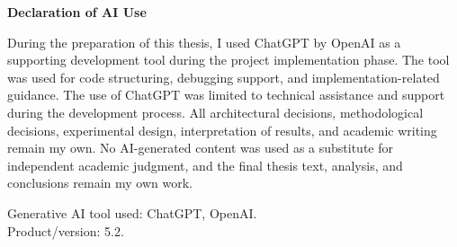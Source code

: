 \newpage
\vspace*{2.2 cm}
{\Large
\noindent
{\bf Declaration of AI Use}} \\
\vspace*{0.3 cm}

\noindent
During the preparation of this thesis, I used ChatGPT by OpenAI as a
supporting development tool during the project implementation phase. The
tool was used for code structuring, debugging support, and
implementation-related guidance. The use of ChatGPT was limited to
technical assistance and support during the development process. All
architectural decisions, methodological decisions, experimental design,
interpretation of results, and academic writing remain my own. No
AI-generated content was used as a substitute for independent academic
judgment, and the final thesis text, analysis, and conclusions remain my
own work.

\vspace{0.3cm}
\noindent
Generative AI tool used: ChatGPT, OpenAI. \\
Product/version: 5.2.


\vspace{1cm}
\noindent
\begin{table}[H]
\end{table}
